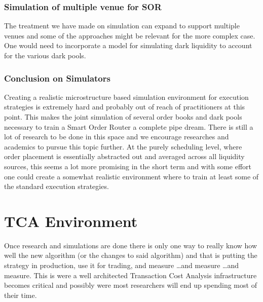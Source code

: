 \subsubsection{Simulation of multiple venue for SOR}

The treatment we have made on simulation can expand to support multiple venues and some of the approaches might be relevant for the more complex case. One would need to incorporate a model for simulating dark liquidity to account for the various dark pools.


\subsubsection{Conclusion on Simulators}

Creating a realistic microstructure based simulation environment for execution strategies is extremely hard and probably out of reach of practitioners at this point. This makes the joint simulation of several order books and dark pools necessary to train a Smart Order Router a complete pipe dream. There is still a lot of research to be done in this space and we encourage researches and academics to pursue this topic further. At the purely scheduling level, where order placement is essentially abstracted out and averaged across all liquidity sources, this seems a lot more promising in the short term and with some effort one could create a somewhat realistic environment where to train at least some of the standard execution strategies.



\section{TCA Environment}

Once research and simulations are done there is only one way to really know how well the new algorithm (or the changes to said algorithm) and that is putting the strategy in production, use it for trading, and measure \dots and measure \dots and measure. This is were a well architected Transaction Cost Analysis infrastructure becomes critical and possibly were most researchers will end up spending most of their time. 


